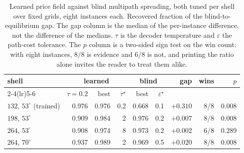 \begin{table}[t]
\centering\scriptsize\setlength{\tabcolsep}{3.4pt}
\caption{Learned price field against blind multipath spreading, both tuned per shell over fixed grids, eight instances each. Recovered fraction of the blind-to-equilibrium gap. The gap column is the median of the per-instance difference, not the difference of the medians. $\tau$ is the decoder temperature and $\varepsilon$ the path-cost tolerance. The $p$ column is a two-sided sign test on the win count: with eight instances, $8/8$ is evidence and $6/8$ is not, and printing the ratio alone invites the reader to treat them alike.}
\label{tab:fair}
\begin{tabular}{@{}lrrrrrrrr@{}}
\toprule
shell & \multicolumn{3}{c}{learned} & \multicolumn{2}{c}{blind} & gap & wins & $p$ \\
\cmidrule(lr){2-4}\cmidrule(lr){5-6}
 & $\tau{=}0.2$ & best & $\tau^\star$ & best & $\varepsilon^\star$ & & & \\
\midrule
$132$, $53^\circ$ (trained) & 0.976 & 0.976 & 0.2 & 0.668 & 0.1 & $+0.310$ & 8/8 & $0.008$ \\
$198$, $53^\circ$ & 0.909 & 0.984 & 2 & 0.976 & 0.2 & $+0.007$ & 8/8 & $0.008$ \\
$264$, $53^\circ$ & 0.908 & 0.974 & 8 & 0.973 & 0.2 & $+0.002$ & 6/8 & $0.289$ \\
$264$, $70^\circ$ & 0.937 & 0.989 & 2 & 0.969 & 0.5 & $+0.020$ & 8/8 & $0.008$ \\
\bottomrule
\end{tabular}
\end{table}
